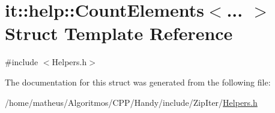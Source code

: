 \hypertarget{structit_1_1help_1_1CountElements}{}\section{it\+:\+:help\+:\+:Count\+Elements$<$... $>$ Struct Template Reference}
\label{structit_1_1help_1_1CountElements}


{\ttfamily \#include $<$Helpers.\+h$>$}



The documentation for this struct was generated from the following file\+:\begin{DoxyCompactItemize}
\item 
/home/matheus/\+Algoritmos/\+C\+P\+P/\+Handy/include/\+Zip\+Iter/\hyperlink{ZipIter_2Helpers_8h}{Helpers.\+h}\end{DoxyCompactItemize}
